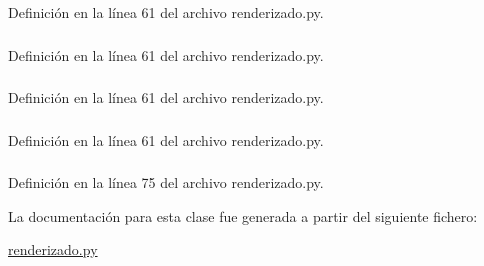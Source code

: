 Definición en la línea 61 del archivo renderizado.py.

\hypertarget{classrenderizado_1_1renderizado_a54c4ebbaf251f0aa7e540f58f5b0f5eb}{
\subsubsection[{image}]{}}
\label{classrenderizado_1_1renderizado_a54c4ebbaf251f0aa7e540f58f5b0f5eb}


Definición en la línea 61 del archivo renderizado.py.

\hypertarget{classrenderizado_1_1renderizado_af7128f70b3c3a2131bde3e83dbb28da0}{
\subsubsection[{nombre\_\-archivo}]{}}
\label{classrenderizado_1_1renderizado_af7128f70b3c3a2131bde3e83dbb28da0}


Definición en la línea 61 del archivo renderizado.py.

\hypertarget{classrenderizado_1_1renderizado_a99de1ed3c1a24b5d9a3da2b2905bd571}{
\subsubsection[{nombre\_\-archivo1}]{}}
\label{classrenderizado_1_1renderizado_a99de1ed3c1a24b5d9a3da2b2905bd571}


Definición en la línea 61 del archivo renderizado.py.

\hypertarget{classrenderizado_1_1renderizado_af50ef1daafbc8bf96205e5487dc54503}{
\subsubsection[{robot}]{}}
\label{classrenderizado_1_1renderizado_af50ef1daafbc8bf96205e5487dc54503}


Definición en la línea 75 del archivo renderizado.py.



La documentación para esta clase fue generada a partir del siguiente fichero:\begin{DoxyCompactItemize}
\item 
\hyperlink{renderizado_8py}{renderizado.py}\end{DoxyCompactItemize}

